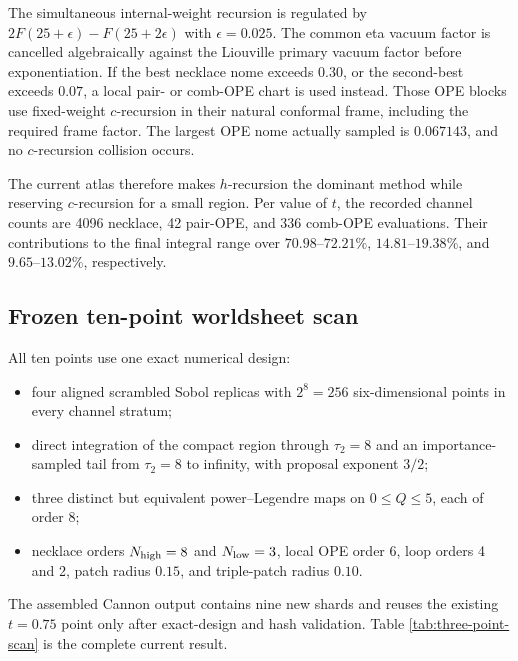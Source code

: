 \documentclass[11pt]{article}
\begin{document}
The simultaneous internal-weight recursion is regulated by
$2F(25+\epsilon)-F(25+2\epsilon)$ with $\epsilon=0.025$.  The common eta
vacuum factor is cancelled algebraically against the Liouville primary vacuum
factor before exponentiation.  If the best necklace nome exceeds $0.30$, or
the second-best exceeds $0.07$, a local pair- or comb-OPE chart is used
instead.  Those OPE blocks use fixed-weight $c$-recursion in their natural
conformal frame, including the required frame factor.  The largest OPE nome
actually sampled is $0.067143$, and no $c$-recursion collision occurs.

The current atlas therefore makes $h$-recursion the dominant method while
reserving $c$-recursion for a small region.  Per value of $t$, the recorded
channel counts are 4096 necklace, 42 pair-OPE, and 336 comb-OPE evaluations.
Their contributions to the final integral range over $70.98$--$72.21\%$,
$14.81$--$19.38\%$, and $9.65$--$13.02\%$, respectively.

\subsection{Frozen ten-point worldsheet scan}

All ten points use one exact numerical design:
\begin{itemize}
  \item four aligned scrambled Sobol replicas with $2^8=256$
  six-dimensional points in every channel stratum;
  \item direct integration of the compact region through $\tau_2=8$ and an
  importance-sampled tail from $\tau_2=8$ to infinity, with proposal exponent
  $3/2$;
  \item three distinct but equivalent power--Legendre maps on
  $0\leq Q\leq5$, each of order 8;
  \item necklace orders $N_{\rm high}=8$ and $N_{\rm low}=3$, local OPE
  order 6, loop orders 4 and 2, patch radius $0.15$, and triple-patch radius
  $0.10$.
\end{itemize}

The assembled Cannon output contains nine new shards and reuses the existing
$t=0.75$ point only after exact-design and hash validation.  Table
\ref{tab:three-point-scan} is the complete current result.
\end{document}
